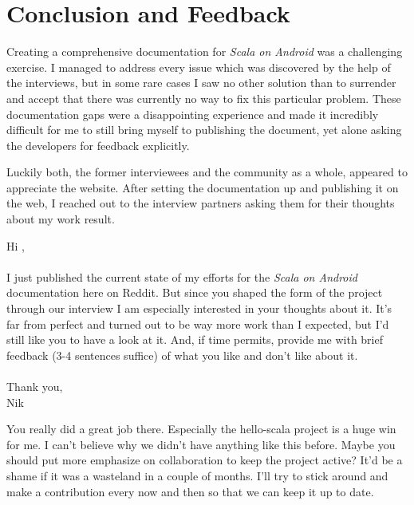 \section{Conclusion and Feedback}

Creating a comprehensive documentation for \textit{Scala on Android} was a challenging exercise. I managed to address every issue which was discovered by the help of the interviews, but in some rare cases I saw no other solution than to surrender and accept that there was currently no way to fix this particular problem. These documentation gaps were a disappointing experience and made it incredibly difficult for me to still bring myself to publishing the document, yet alone asking the developers for feedback explicitly.

Luckily both, the former interviewees and the community as a whole, appeared to appreciate the website. After setting the documentation up and publishing it on the web, I reached out to the interview partners asking them for their thoughts about my work result.

\begin{displayquote}

	Hi \underline{\hspace{2cm}},\\\\

	I just published the current state of my efforts for the \textit{Scala on Android} documentation here on Reddit. But since you shaped the form of the project through our interview I am especially interested in your thoughts about it.
	It's far from perfect and turned out to be way more work than I expected, but I'd still like you to have a look at it. And, if time permits, provide me with brief feedback (3-4 sentences suffice) of what you like and don't like about it.\\\\
	Thank you,\\
	Nik

\end{displayquote}

\hrulefill

\begin{displayquote}

	You really did a great job there. Especially the hello-scala project is a huge win for me. I can't believe why we didn't have anything like this before. Maybe you should put more emphasize on collaboration to keep the project active? It'd be a shame if it was a wasteland in a couple of months. I'll try to stick around and make a contribution every now and then so that we can keep it up to date.

\end{displayquote}

